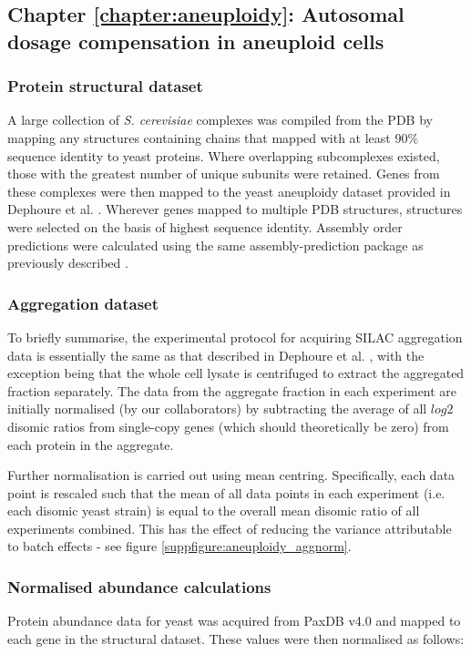 \documentclass[a4paper,11pt,twoside,openright]{scrbook}
\begin{document}
\subsection{Chapter \ref*{chapter:aneuploidy}: Autosomal dosage compensation in aneuploid cells}
\subsubsection{Protein structural dataset}
A large collection of \textit{S. cerevisiae} complexes was compiled from the PDB by mapping any structures containing chains that mapped with at least 90\% sequence identity to yeast proteins. Where overlapping subcomplexes existed, those with the greatest number of unique subunits were retained. Genes from these complexes were then mapped to the yeast aneuploidy dataset provided in Dephoure et al. \cite{Dephoure2014}. Wherever genes mapped to multiple PDB structures, structures were selected on the basis of highest sequence identity. Assembly order predictions were calculated using the same assembly-prediction package as previously described \cite{Wells2016}.


\subsubsection{Aggregation dataset}
To briefly summarise, the experimental protocol for acquiring SILAC aggregation data is essentially the same as that described in Dephoure et al. \cite{Dephoure2014}, with the exception being that the whole cell lysate is centrifuged to extract the aggregated fraction separately. The data from the aggregate fraction in each experiment are initially normalised (by our collaborators) by subtracting the average of all $log{2}$ disomic ratios from single-copy genes (which should theoretically be zero) from each protein in the aggregate.

Further normalisation is carried out using mean centring. Specifically, each data point is rescaled such that the mean of all data points in each experiment (i.e. each disomic yeast strain) is equal to the overall mean disomic ratio of all experiments combined. This has the effect of reducing the variance attributable to batch effects - see figure \ref{suppfigure:aneuploidy_aggnorm}.

\subsubsection{Normalised abundance calculations}
Protein abundance data for yeast was acquired from PaxDB v4.0 \cite{Wang2015} and mapped to each gene in the structural dataset. These values were then normalised as follows:
\end{document}

